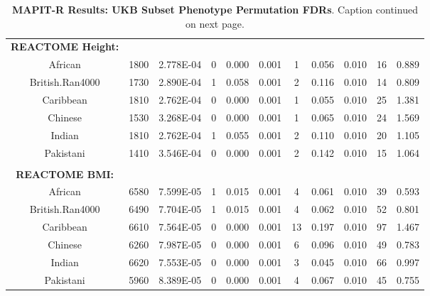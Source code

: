 \documentclass[12pt, a4paper]{article}
\begin{document}
\begin{landscape}
\begin{table}[ht]
\begin{tabular}{ccccccccccc}
  \textbf{REACTOME Height:} & & & & & & & & & \\
  African & 1800 & 2.778E-04 & 0 & 0.000 & 0.001 & 1 & 0.056 & 0.010 & 16 & 0.889 \\
  British.Ran4000 & 1730 & 2.890E-04 & 1 & 0.058 & 0.001 & 2 & 0.116 & 0.010 & 14 & 0.809 \\
  Caribbean & 1810 & 2.762E-04 & 0 & 0.000 & 0.001 & 1 & 0.055 & 0.010 & 25 & 1.381 \\
  Chinese & 1530 & 3.268E-04 & 0 & 0.000 & 0.001 & 1 & 0.065 & 0.010 & 24 & 1.569 \\
  Indian & 1810 & 2.762E-04 & 1 & 0.055 & 0.001 & 2 & 0.110 & 0.010 & 20 & 1.105 \\
  Pakistani & 1410 & 3.546E-04 & 0 & 0.000 & 0.001 & 2 & 0.142 & 0.010 & 15 & 1.064 \\
  \\
  \textbf{REACTOME BMI:} & & & & & & & & & \\
African & 6580 & 7.599E-05 & 1 & 0.015 & 0.001 & 4 & 0.061 & 0.010 & 39 & 0.593 \\
  British.Ran4000 & 6490 & 7.704E-05 & 1 & 0.015 & 0.001 & 4 & 0.062 & 0.010 & 52 & 0.801 \\
  Caribbean & 6610 & 7.564E-05 & 0 & 0.000 & 0.001 & 13 & 0.197 & 0.010 & 97 & 1.467 \\
  Chinese & 6260 & 7.987E-05 & 0 & 0.000 & 0.001 & 6 & 0.096 & 0.010 & 49 & 0.783 \\
  Indian & 6620 & 7.553E-05 & 0 & 0.000 & 0.001 & 3 & 0.045 & 0.010 & 66 & 0.997 \\
  Pakistani & 5960 & 8.389E-05 & 0 & 0.000 & 0.001 & 4 & 0.067 & 0.010 & 45 & 0.755 \\
   \hline
\end{tabular}
\caption[TBD]{\textbf{MAPIT-R Results: UKB Subset Phenotype Permutation FDRs}. Caption continued on next page. }
\label{InterPath-Supp-Tables-AllPops-FDRs}
\end{table}
\end{landscape}
\clearpage
\setlength{\footskip}{1cm}
\end{document}
